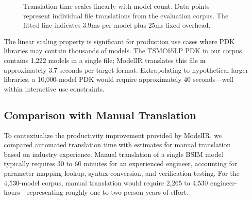 \documentclass[conference]{IEEEtran}
\begin{document}
\begin{figure}[!t]
\centering
{}
\caption{Translation time scales linearly with model count. Data points represent individual file translations from the evaluation corpus. The fitted line indicates 3.9ms per model plus 25ms fixed overhead.}
\label{fig:scaling}
\end{figure}

The linear scaling property is significant for production use cases where PDK libraries may contain thousands of models. The TSMC65LP PDK in our corpus contains 1,222 models in a single file; ModelIR translates this file in approximately 3.7 seconds per target format. Extrapolating to hypothetical larger libraries, a 10,000-model PDK would require approximately 40 seconds---well within interactive use constraints.

\subsection{Comparison with Manual Translation}

To contextualize the productivity improvement provided by ModelIR, we compared automated translation time with estimates for manual translation based on industry experience. Manual translation of a single BSIM model typically requires 30 to 60 minutes for an experienced engineer, accounting for parameter mapping lookup, syntax conversion, and verification testing. For the 4,530-model corpus, manual translation would require 2,265 to 4,530 engineer-hours---representing roughly one to two person-years of effort.
\end{document}
